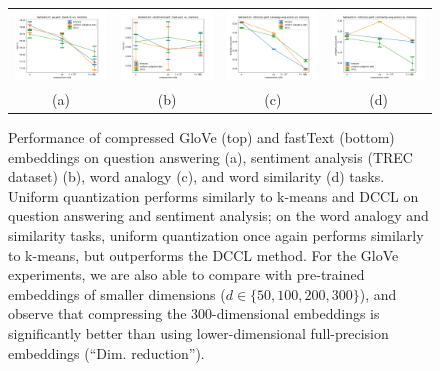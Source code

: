 \begin{figure}
\begin{tabular}{@{\hskip -0.0in}c@{\hskip -0.0in}c@{\hskip -0.0in}c@{\hskip -0.0in}c@{\hskip -0.0in}}
		\includegraphics[width=.245\linewidth]{figures/fasttext1m_qa_best-f1_vs_compression.pdf} &
		\includegraphics[width=.245\linewidth]{figures/fasttext1m_sentiment_trec_test-acc_vs_compression.pdf} &
		\includegraphics[width=.245\linewidth]{figures/fasttext1m_intrinsics_analogy-avg-score_vs_compression.pdf} &
		\includegraphics[width=.245\linewidth]{figures/fasttext1m_intrinsics_similarity-avg-score_vs_compression.pdf} \\
		\;\;\;\;\;(a) & \;\;\;\;\;\;(b) & \;\;\;\;\;\;(c) & \;\;\;\;\;\;(d)
	\end{tabular}
\caption{Performance of compressed GloVe (top) and fastText (bottom) embeddings on question answering (a), sentiment analysis (TREC dataset) (b), word analogy (c), and word similarity (d) tasks.
Uniform quantization performs similarly to k-means and DCCL on question answering and sentiment analysis;
on the word analogy and similarity tasks, uniform quantization once again performs similarly to k-means, but outperforms the DCCL method.
For the GloVe experiments, we are also able to compare with pre-trained embeddings of smaller dimensions ($d\in\{50,100,200,300\}$), and observe that compressing the 300-dimensional embeddings is significantly better than using lower-dimensional full-precision embeddings (``Dim. reduction'').
}
\label{fig:comparison_results}
\end{figure}

